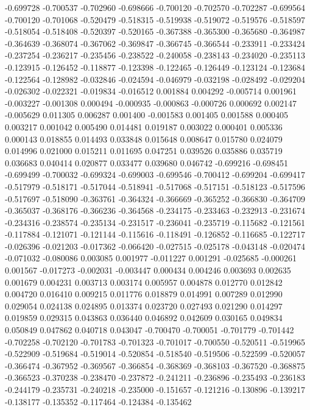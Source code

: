 -0.699728
-0.700537
-0.702960
-0.698666
-0.700120
-0.702570
-0.702287
-0.699564
-0.700120
-0.701068
-0.520479
-0.518315
-0.519938
-0.519072
-0.519576
-0.518597
-0.518054
-0.518408
-0.520397
-0.520165
-0.367388
-0.365300
-0.365680
-0.364987
-0.364639
-0.368074
-0.367062
-0.369847
-0.366745
-0.366544
-0.233911
-0.233424
-0.237254
-0.236217
-0.235456
-0.238522
-0.240058
-0.238143
-0.234020
-0.235113
-0.123915
-0.126452
-0.118877
-0.123398
-0.122465
-0.126449
-0.123124
-0.123684
-0.122564
-0.128982
-0.032846
-0.024594
-0.046979
-0.032198
-0.028492
-0.029204
-0.026302
-0.022321
-0.019834
-0.016512
0.001884
0.004292
-0.005714
0.001961
-0.003227
-0.001308
0.000494
-0.000935
-0.000863
-0.000726
0.000692
0.002147
-0.005629
0.011305
0.006287
0.001400
-0.001583
0.001405
0.001588
0.000405
0.003217
0.001042
0.005490
0.014481
0.019187
0.003022
0.000401
0.005336
0.000143
0.018855
0.014493
0.033848
0.015648
0.008647
0.015780
0.024079
0.014996
0.021000
0.015211
0.011695
0.047251
0.039526
0.035886
0.035719
0.036683
0.040414
0.020877
0.033477
0.039680
0.046742
-0.699216
-0.698451
-0.699499
-0.700032
-0.699324
-0.699003
-0.699546
-0.700412
-0.699204
-0.699417
-0.517979
-0.518171
-0.517044
-0.518941
-0.517068
-0.517151
-0.518123
-0.517596
-0.517697
-0.518090
-0.363761
-0.364324
-0.366669
-0.365252
-0.366830
-0.364709
-0.365037
-0.368176
-0.366236
-0.364568
-0.234175
-0.233463
-0.232913
-0.231674
-0.234316
-0.238574
-0.235134
-0.231517
-0.236041
-0.235719
-0.115682
-0.121561
-0.117884
-0.121071
-0.121144
-0.115616
-0.118491
-0.126852
-0.116685
-0.122717
-0.026396
-0.021203
-0.017362
-0.066420
-0.027515
-0.025178
-0.043148
-0.020474
-0.071032
-0.080086
0.003085
0.001977
-0.011227
0.001291
-0.025685
-0.000261
0.001567
-0.017273
-0.002031
-0.003447
0.000434
0.004246
0.003693
0.002635
0.001679
0.004231
0.003713
0.003174
0.005957
0.004878
0.012770
0.012842
0.004720
0.016410
0.009215
0.011776
0.018879
0.014991
0.007289
0.012990
0.029054
0.024138
0.024895
0.013374
0.023720
0.027493
0.021290
0.014297
0.019859
0.029315
0.043863
0.036440
0.046892
0.042609
0.030165
0.049834
0.050849
0.047862
0.040718
0.043047
-0.700470
-0.700051
-0.701779
-0.701442
-0.702258
-0.702120
-0.701783
-0.701323
-0.701017
-0.700550
-0.520511
-0.519965
-0.522909
-0.519684
-0.519014
-0.520854
-0.518540
-0.519506
-0.522599
-0.520057
-0.366474
-0.367952
-0.369567
-0.366854
-0.368369
-0.368103
-0.367520
-0.368875
-0.366523
-0.370238
-0.238470
-0.237872
-0.241211
-0.236896
-0.235493
-0.236183
-0.244179
-0.235731
-0.240218
-0.235000
-0.151657
-0.121216
-0.130896
-0.139217
-0.138177
-0.135352
-0.117464
-0.124384
-0.135462

